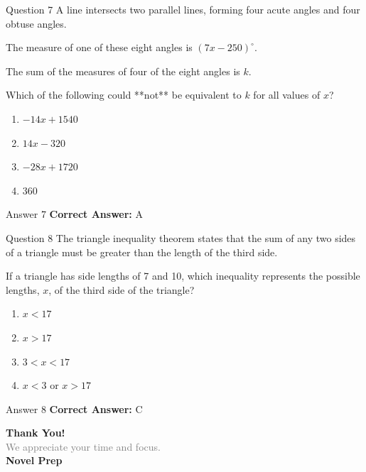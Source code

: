 \documentclass{beamer}
\begin{document}
\begin{frame}{Question 7}
\small
A line intersects two parallel lines, forming four acute angles and four obtuse angles.

The measure of one of these eight angles is \((7x - 250)^\circ\).

The sum of the measures of four of the eight angles is \(k\).

Which of the following could **not** be equivalent to \(k\) for all values of \(x\)?
\vspace{0.35cm}
\begin{enumerate}
    \item[A.] \(-14x + 1540\)
    \item[B.] \(14x - 320\)
    \item[C.] \(-28x + 1720\)
    \item[D.] 360
\end{enumerate}
\end{frame}
\begin{frame}{Answer 7}
\small
\textbf{Correct Answer:} A
\end{frame}

\begin{frame}{Question 8}
\small
The triangle inequality theorem states that the sum of any two sides of a triangle must be greater than the length of the third side.

If a triangle has side lengths of 7 and 10, which inequality represents the possible lengths, \(x\), of the third side of the triangle?
\vspace{0.35cm}
\begin{enumerate}
    \item[A.] \(x < 17\)
    \item[B.] \(x > 17\)
    \item[C.] \(3 < x < 17\)
    \item[D.] \(x < 3\) or \(x > 17\)
\end{enumerate}
\end{frame}
\begin{frame}{Answer 8}
\small
\textbf{Correct Answer:} C
\end{frame}

\begin{frame}{}
    \centering
    \vspace{5em}
    {\Huge \textbf{\textcolor{novelPurple}{Thank You!}}} \\[1em]
    {\large \textcolor{gray}{We appreciate your time and focus.}} \\[3em]
    {\LARGE \textbf{\textcolor{novelPurple}{\textsf{Novel Prep}}}}
    \vfill
\end{frame}
\end{document}
